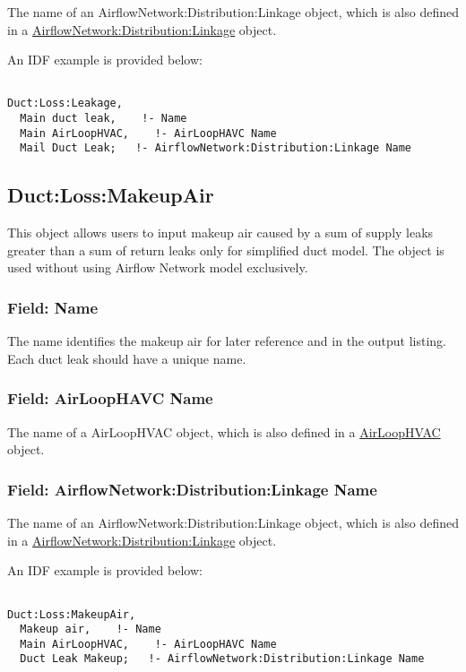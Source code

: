 The name of an AirflowNetwork:Distribution:Linkage object, which is also defined in a \hyperref[airflownetworkdistributionlinkage]{AirflowNetwork:Distribution:Linkage} object.

An IDF example is provided below:

\begin{lstlisting}

Duct:Loss:Leakage,
  Main duct leak,    !- Name
  Main AirLoopHVAC,    !- AirLoopHAVC Name
  Mail Duct Leak;   !- AirflowNetwork:Distribution:Linkage Name

\end{lstlisting}

\subsection{Duct:Loss:MakeupAir}\label{ductlossmakeupair}

This object allows users to input makeup air caused by a sum of supply leaks greater than a sum of return leaks only for simplified duct model. The object is used without using Airflow Network model exclusively. 

\subsubsection{Field: Name}\label{duct-leakage-field-name-duct-000}

The name identifies the makeup air for later reference and in the output listing. Each duct leak should have a unique name.

\subsubsection{Field: AirLoopHAVC Name}\label{duct-leakage-airloophavcname}

The name of a AirLoopHVAC object, which is also defined in a \hyperref[airloophvac]{AirLoopHVAC} object.

\subsubsection{Field: AirflowNetwork:Distribution:Linkage Name}\label{airflownetworkdistributionlinkagename}

The name of an AirflowNetwork:Distribution:Linkage object, which is also defined in a \hyperref[airflownetworkdistributionlinkage]{AirflowNetwork:Distribution:Linkage} object.

An IDF example is provided below:

\begin{lstlisting}

Duct:Loss:MakeupAir,
  Makeup air,    !- Name
  Main AirLoopHVAC,    !- AirLoopHAVC Name
  Duct Leak Makeup;   !- AirflowNetwork:Distribution:Linkage Name

\end{lstlisting}

